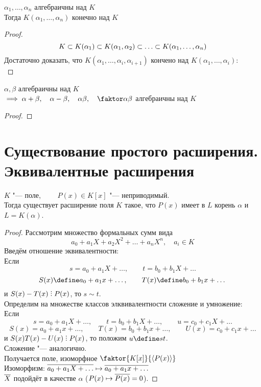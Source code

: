 \begin{implication}
	$ \alpha_1, \dots, \alpha_n $ алгебраичны над $ K $ \\
	Тогда $ K(\alpha_1, \dots, \alpha_n) $ конечно над $ K $
\end{implication}

\begin{proof}
	$$ K \sub K(\alpha_1) \sub K(\alpha_1, \alpha_2) \sub \dots \sub K(\alpha_1, \dots, \alpha_n) $$
	Достаточно доказать, что $ K(\alpha_1, \dots, \alpha_i, \alpha_{i + 1}) $ кончено над $ K(\alpha_1, \dots, \alpha_i) $: \\
	\widedots[5cm]
\end{proof}

\begin{implication}
	$ \alpha, \beta $ алгебраичны над $ K $ \\
	$ \implies \alpha + \beta, \quad \alpha - \beta, \quad \alpha \beta, \quad \faktor\alpha\beta $ алгебраичны над $ K $
\end{implication}

\begin{proof}
\end{proof}

\section{Существование простого расширения. Эквивалентные расширения}

\begin{theorem}
	$ K $ "--- поле, $ \qquad P(x) \in K[x] $ "--- неприводимый. \\
	Тогда существует расширение поля $ K $ такое, что $ P(x) $ имеет в $ L $ корень $ \alpha $ и $ L = K(\alpha) $.
\end{theorem}

\begin{proof}
	Рассмотрим множество формальных сумм вида
	$$ a_0 + a_1X + a_2X^2 + \dots + a_nX^n, \quad a_i \in K $$
	Введём отношение эквивалентности: \\
	Если
	$$ s = a_0 + a_1X + \dots, \qquad t = b_0 + b_1X + \dots $$
	$$ S(x) \define a_0 + a_1x + \dots, \qquad T(x) \define b_0 + b_1x + \dots $$
	и $ S(x) - T(x) \divby P(x) $, то $ s \sim t $. \\
	Определим на множестве классов элквивалентности сложение и умножение: \\
	Если
	$$ s = a_0 + a_1X + \dots, \qquad t = b_0 + b_1X + \dots, \qquad u = c_0 + c_1X + \dots $$
	$$ S(x) = a_0 + a_1x + \dots, \qquad T(x) = b_0 + b_1x + \dots, \qquad U(x) = c_0 + c_1x + \dots $$
	и $ S(x)T(x) - U(x) \divby P(x) $, то положим $ u \define st $. \\
	Сложение "--- аналогично. \\
	Получается поле, изоморфное $ \faktor{K[x]}{\braket{P(x)}} $ \\
	Изоморфизм: $ \overline{a_0 + a_1X + \dots} \mapsto \overline{a_0 + a_1x + \dots} $ \\
	$ \overline X $ подойдёт в качестве $ \alpha $ (\as $ P(x) \mapsto \overline{P(x)} = 0 $).
\end{proof}

